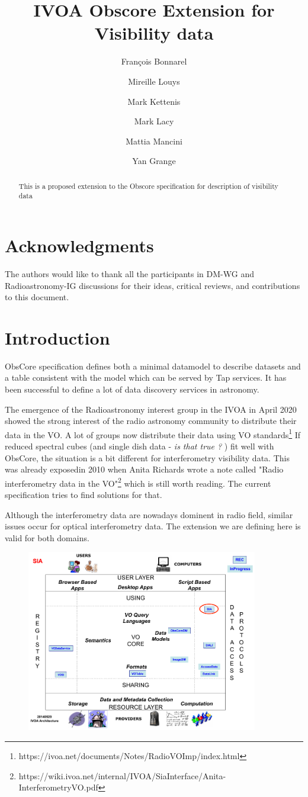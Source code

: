 \documentclass[11pt,a4paper]{ivoa}
\title{IVOA Obscore Extension for Visibility data}
\author{Fran\c cois Bonnarel}
\author{Mireille Louys}
\author{Mark Kettenis}
\author{Mark Lacy}
\author{Mattia Mancini}
\author{Yan Grange}
\begin{document}
\begin{abstract}
	This is a proposed extension to the Obscore specification for description of visibility data
\end{abstract}

\section*{Acknowledgments}

The authors would like to thank all the participants in DM-WG and Radioastronomy-IG discussions  for their ideas, critical reviews, and contributions to this document.

\section{Introduction}
ObsCore specification \citep{std:OBSCORE} defines both a minimal datamodel to describe datasets and a table consistent with the model which can be served by Tap services. It has been successful to define a lot of data discovery services in astronomy.

The emergence of the Radioastronomy interest group in the IVOA in April 2020 showed the strong interest of the radio astronomy community to distribute their data in the VO. A lot of groups now distribute their data using VO standards\footnote{https://ivoa.net/documents/Notes/RadioVOImp/index.html} If reduced spectral cubes (and single dish data - {\it is that true ?} ) fit well with ObsCore, the situation is a bit different for interferometry visibility data. This was already exposedin 2010 when Anita Richards wrote a note called "Radio interferometry data in the VO"\footnote{https://wiki.ivoa.net/internal/IVOA/SiaInterface/Anita-InterferometryVO.pdf} which is still worth reading. The current specification tries to find solutions for that. 
 
Although the interferometry data are nowadays dominent in radio field, similar issues occur for optical interferometry data. The extension we are defining here is valid for both domains.  


\begin{figure}[H]
\centering

\includegraphics[width=0.9\textwidth]{archdiag.png}
\label{fig:architecture}
\end{figure}
\end{document}
